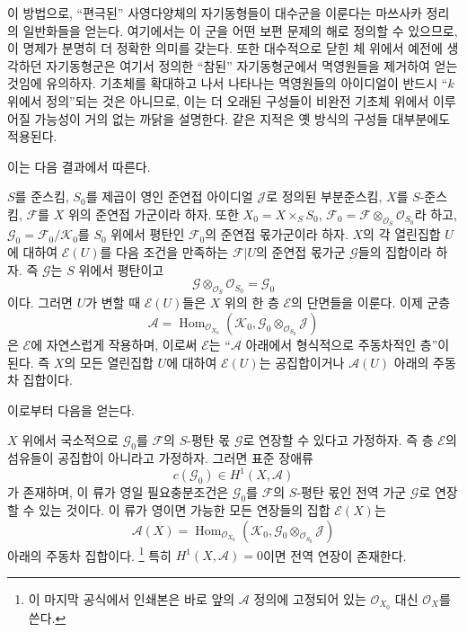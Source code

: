 이 방법으로, ``편극된'' 사영다양체의 자기동형들이 대수군을 이룬다는
마쓰사카 정리의 일반화들을 얻는다. 여기에서는 이 군을 어떤 보편 문제의
해로 정의할 수 있으므로, 이 명제가 분명히 더 정확한 의미를 갖는다.
또한 대수적으로 닫힌 체 위에서 예전에 생각하던 자기동형군은 여기서
정의한 ``참된'' 자기동형군에서 멱영원들을 제거하여 얻는 것임에 유의하자.
기초체를 확대하고 나서 나타나는 멱영원들의 아이디얼이 반드시 ``$k$ 위에서
정의''되는 것은 아니므로, 이는 더 오래된 구성들이 비완전 기초체 위에서
이루어질 가능성이 거의 없는 까닭을 설명한다. 같은 지적은 옛 방식의
구성들 대부분에도 적용된다.


이는 다음 결과에서 따른다.

 $S$를 준스킴, $S_0$를 제곱이 영인 준연접
아이디얼 $\mathcal J$로 정의된 부분준스킴, $X$를 $S$-준스킴,
$\mathcal F$를 $X$ 위의 준연접 가군이라 하자. 또한
$X_0=X\times_SS_0$,
$\mathcal F_0=\mathcal F\otimes_{\mathcal O_S}\mathcal O_{S_0}$라 하고,
$\mathcal G_0=\mathcal F_0/\mathcal K_0$를 $S_0$ 위에서 평탄인
$\mathcal F_0$의 준연접 몫가군이라 하자. $X$의 각 열린집합 $U$에
대하여 $\mathcal E(U)$를 다음 조건을 만족하는 $\mathcal F|U$의 준연접
몫가군 $\mathcal G$들의 집합이라 하자. 즉 $\mathcal G$는 $S$ 위에서
평탄이고
\[
\mathcal G\otimes_{\mathcal O_S}\mathcal O_{S_0}=\mathcal G_0
\]
이다. 그러면 $U$가 변할 때 $\mathcal E(U)$들은 $X$ 위의 한 층
$\mathcal E$의 단면들을 이룬다. 이제 군층
\[
\mathcal A=\operatorname{Hom}_{\mathcal O_{X_0}}
(\mathcal K_0,\mathcal G_0\otimes_{\mathcal O_{S_0}}\mathcal J)
\]
은 $\mathcal E$에 자연스럽게 작용하며, 이로써 $\mathcal E$는
``$\mathcal A$ 아래에서 형식적으로 주동차적인 층''이 된다. 즉 $X$의
모든 열린집합 $U$에 대하여 $\mathcal E(U)$는 공집합이거나
$\mathcal A(U)$ 아래의 주동차 집합이다.

이로부터 다음을 얻는다.

 $X$ 위에서 국소적으로 $\mathcal G_0$를
$\mathcal F$의 $S$-평탄 몫 $\mathcal G$로 연장할 수 있다고 가정하자.
즉 층 $\mathcal E$의 섬유들이 공집합이 아니라고 가정하자. 그러면 표준
장애류
\[
c(\mathcal G_0)\in H^1(X,\mathcal A)
\]
가 존재하며, 이 류가 영일 필요충분조건은 $\mathcal G_0$를
$\mathcal F$의 $S$-평탄 몫인 전역 가군 $\mathcal G$로 연장할 수 있는
것이다. 이 류가 영이면 가능한 모든 연장들의 집합 $\mathcal E(X)$는
\[
\mathcal A(X)=\operatorname{Hom}_{\mathcal O_{X_0}}
(\mathcal K_0,\mathcal G_0\otimes_{\mathcal O_{S_0}}\mathcal J)
\]
아래의 주동차 집합이다.
\footnote{이 마지막 공식에서 인쇄본은 바로 앞의 $\mathcal A$ 정의에
고정되어 있는 $\mathcal O_{X_0}$ 대신 $\mathcal O_X$를 쓴다.}
특히 $H^1(X,\mathcal A)=0$이면 전역 연장이 존재한다.

